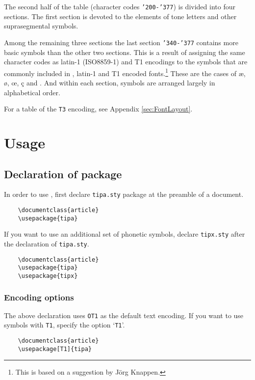 The second half of the table (character codes \texttt{'200-'377}) is
divided into four sections. The first section is devoted to the
elements of tone letters and other suprasegmental symbols.

Among the remaining three sections the last section \texttt{'340-'377}
contains more basic symbols than the other two sections. This is a
result of assigning the same character codes as latin-1 (ISO8859-1)
and T1 encodings to the symbols that are commonly included in \tipa{},
latin-1 and T1 encoded fonts.\footnote{This is based on a suggestion
  by J\"org Knappen.} These are the cases of \ae{}, \o, \oe{}, \c{c}
and \textthorn. And within each section, symbols are arranged largely
in alphabetical order.

For a table of the \texttt{T3} encoding, see Appendix
\ref{sec:FontLayout}.



\clearemptydoublepage
\chapter{Usage}

\section{Declaration of \tipa{} package}

In order to use \tipa{}, first declare \texttt{tipa.sty} package at
the preamble of a document.

\begin{verbatim}
    \documentclass{article}
    \usepackage{tipa}
\end{verbatim}

If you want to use an additional set of phonetic symbols, declare
\texttt{tipx.sty} after the declaration of \texttt{tipa.sty}.

\begin{verbatim}
    \documentclass{article}
    \usepackage{tipa}
    \usepackage{tipx}
\end{verbatim}

\subsection{Encoding options}

The above declaration uses \texttt{OT1} as the default text encoding. If 
you want to use \tipa{} symbols with \texttt{T1}, specify the option
`\texttt{T1}'.

\begin{verbatim}
    \documentclass{article}
    \usepackage[T1]{tipa}
\end{verbatim}

